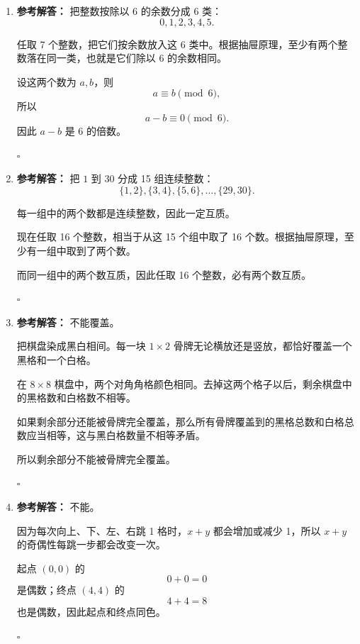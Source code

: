 \documentclass[11pt,a4paper,fontset=fandol]{ctexart}
\newenvironment{solution}{\par\noindent\textbf{参考解答：}}{\hfill$\square$\par}
\begin{document}
\begin{enumerate}
\begin{solution}
  总数为
  \[
  60+90=150.
  \]

  \end{solution}

  \item \begin{solution}
  把整数按除以 6 的余数分成 6 类：
  \[
  0,1,2,3,4,5.
  \]

  任取 7 个整数，把它们按余数放入这 6 类中。根据抽屉原理，至少有两个整数落在同一类，也就是它们除以 6 的余数相同。

  设这两个数为 $a,b$，则
  \[
  a\equiv b\pmod 6,
  \]
  所以
  \[
  a-b\equiv 0\pmod 6.
  \]
  因此 $a-b$ 是 6 的倍数。

  \end{solution}

  \item \begin{solution}
  把 $1$ 到 $30$ 分成 15 组连续整数：
  \[
  \{1,2\},\{3,4\},\{5,6\},\ldots,\{29,30\}.
  \]

  每一组中的两个数都是连续整数，因此一定互质。

  现在任取 16 个整数，相当于从这 15 个组中取了 16 个数。根据抽屉原理，至少有一组中取到了两个数。

  而同一组中的两个数互质，因此任取 16 个整数，必有两个数互质。

  \end{solution}

  \item \begin{solution}
  不能覆盖。

  把棋盘染成黑白相间。每一块 $1\times 2$ 骨牌无论横放还是竖放，都恰好覆盖一个黑格和一个白格。

  在 $8\times 8$ 棋盘中，两个对角角格颜色相同。去掉这两个格子以后，剩余棋盘中的黑格数和白格数不相等。

  如果剩余部分还能被骨牌完全覆盖，那么所有骨牌覆盖到的黑格总数和白格总数应当相等，这与黑白格数量不相等矛盾。

  所以剩余部分不能被骨牌完全覆盖。

  \end{solution}

  \item \begin{solution}
  不能。

  因为每次向上、下、左、右跳 1 格时，$x+y$ 都会增加或减少 1，所以 $x+y$ 的奇偶性每跳一步都会改变一次。

  起点 $(0,0)$ 的
  \[
  0+0=0
  \]
  是偶数；终点 $(4,4)$ 的
  \[
  4+4=8
  \]
  也是偶数，因此起点和终点同色。


\end{solution}
\end{enumerate}
\end{document}
